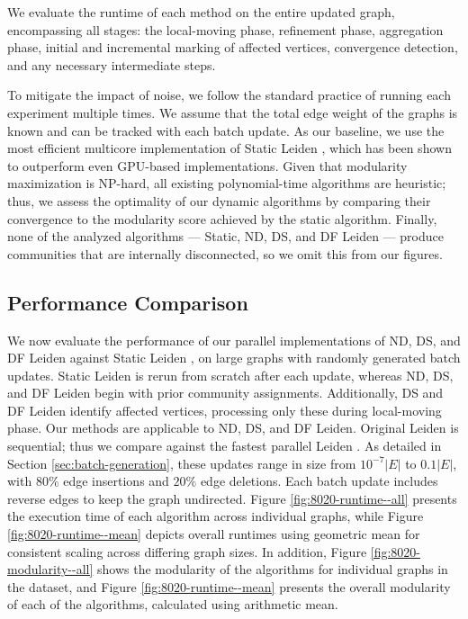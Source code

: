 We evaluate the runtime of each method on the entire updated graph, encompassing all stages: the local-moving phase, refinement phase, aggregation phase, initial and incremental marking of affected vertices, convergence detection, and any necessary intermediate steps. To mitigate the impact of noise, we follow the standard practice of running each experiment multiple times. We assume that the total edge weight of the graphs is known and can be tracked with each batch update. As our baseline, we use the most efficient multicore implementation of Static Leiden \cite{sahu2024fast}, which has been shown to outperform even GPU-based implementations. Given that modularity maximization is NP-hard, all existing polynomial-time algorithms are heuristic; thus, we assess the optimality of our dynamic algorithms by comparing their convergence to the modularity score achieved by the static algorithm. Finally, none of the analyzed algorithms --- Static, ND, DS, and DF Leiden --- produce communities that are internally disconnected, so we omit this from our figures.



% 




\subsection{Performance Comparison}
\label{sec:performance-comparison}

We now evaluate the performance of our parallel implementations of ND, DS, and DF Leiden against Static Leiden \cite{sahu2024fast}, on large graphs with randomly generated batch updates. Static Leiden is rerun from scratch after each update, whereas ND, DS, and DF Leiden begin with prior community assignments. Additionally, DS and DF Leiden identify affected vertices, processing only these during local-moving phase. Our methods are applicable to ND, DS, and DF Leiden. Original Leiden \cite{com-traag19} is sequential; thus we compare against the fastest parallel Leiden \cite{sahu2024fast}. As detailed in Section \ref{sec:batch-generation}, these updates range in size from $10^{-7}|E|$ to $0.1|E|$, with $80\%$ edge insertions and $20\%$ edge deletions. Each batch update includes reverse edges to keep the graph undirected. Figure \ref{fig:8020-runtime--all} presents the execution time of each algorithm across individual graphs, while Figure \ref{fig:8020-runtime--mean} depicts overall runtimes using geometric mean for consistent scaling across differing graph sizes. In addition, Figure \ref{fig:8020-modularity--all} shows the modularity of the algorithms for individual graphs in the dataset, and Figure \ref{fig:8020-runtime--mean} presents the overall modularity of each of the algorithms, calculated using arithmetic mean.

